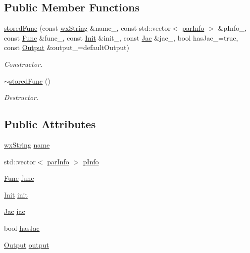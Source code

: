 \subsection*{Public Member Functions}
\begin{DoxyCompactItemize}
\item 
\hyperlink{structstf_1_1storedFunc_a6cfde3ff81a2297aaf4b33ee46a9a7e9}{storedFunc} (const \hyperlink{classwxString}{wxString} \&name\_\-, const std::vector$<$ \hyperlink{structstf_1_1parInfo}{parInfo} $>$ \&pInfo\_\-, const \hyperlink{group__stfgen_ga11d6ec55abceacf5fdd47f9fc889d9a3}{Func} \&func\_\-, const \hyperlink{group__stfgen_ga15ccefdb3c4b758564e73f080639ff98}{Init} \&init\_\-, const \hyperlink{group__stfgen_ga77f3e621f1771784f2befaeb3d1ac4fb}{Jac} \&jac\_\-, bool hasJac\_\-=true, const \hyperlink{group__stfgen_ga66542f63882a99158a17cdc977eac5e8}{Output} \&output\_\-=defaultOutput)
\begin{DoxyCompactList}\small\item\em Constructor. \item\end{DoxyCompactList}\item 
\hypertarget{structstf_1_1storedFunc_a058a7ae12ebbaf5dd5f42eb69052b6e8}{
\hyperlink{structstf_1_1storedFunc_a058a7ae12ebbaf5dd5f42eb69052b6e8}{$\sim$storedFunc} ()}
\label{structstf_1_1storedFunc_a058a7ae12ebbaf5dd5f42eb69052b6e8}

\begin{DoxyCompactList}\small\item\em Destructor. \item\end{DoxyCompactList}\end{DoxyCompactItemize}
\subsection*{Public Attributes}
\begin{DoxyCompactItemize}
\item 
\hyperlink{classwxString}{wxString} \hyperlink{structstf_1_1storedFunc_ac1fe235432b5de9f93817a573b6d9946}{name}
\item 
std::vector$<$ \hyperlink{structstf_1_1parInfo}{parInfo} $>$ \hyperlink{structstf_1_1storedFunc_a2f09fc5276140a85ad4fa61bccc3fd61}{pInfo}
\item 
\hyperlink{group__stfgen_ga11d6ec55abceacf5fdd47f9fc889d9a3}{Func} \hyperlink{structstf_1_1storedFunc_a3ec6459b20161c0331f69902d219e5f4}{func}
\item 
\hyperlink{group__stfgen_ga15ccefdb3c4b758564e73f080639ff98}{Init} \hyperlink{structstf_1_1storedFunc_a825fd7a72e67915cde6439afe8010840}{init}
\item 
\hyperlink{group__stfgen_ga77f3e621f1771784f2befaeb3d1ac4fb}{Jac} \hyperlink{structstf_1_1storedFunc_a5f97002993f83f9c162e2a9fde8125ea}{jac}
\item 
bool \hyperlink{structstf_1_1storedFunc_a26a0e3f68ef57d72e5fd8e967dc15911}{hasJac}
\item 
\hyperlink{group__stfgen_ga66542f63882a99158a17cdc977eac5e8}{Output} \hyperlink{structstf_1_1storedFunc_aad9e1ffc2999387f61578bf9f7461224}{output}
\end{DoxyCompactItemize}


